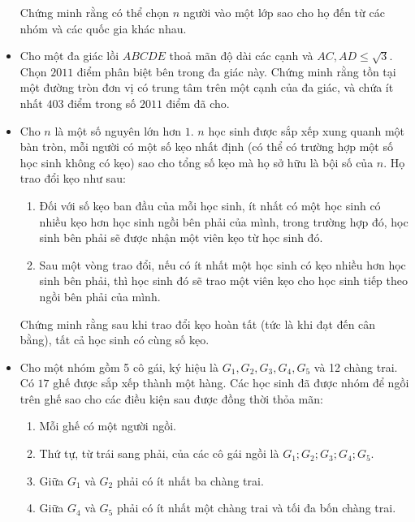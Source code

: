 \documentclass[11pt]{scrartcl}
\begin{document}
\begin{itemize}[label=, leftmargin=0em, itemsep=0.5em]
\begin{btvn}
        Chứng minh rằng có thể chọn $n$ người vào một lớp sao cho họ đến từ các nhóm và các quốc gia khác nhau.
    \end{btvn}

    \item \begin{btvn}
        Cho một đa giác lồi $ABCDE$ thoả mãn độ dài các cạnh và $AC, AD \leq \sqrt{3}.$ Chọn $2011$ điểm phân biệt bên trong đa giác này. Chứng minh rằng tồn tại một đường tròn đơn vị có trung tâm trên một cạnh của đa giác, và chứa ít nhất $403$ điểm trong số $2011$ điểm đã cho.

    \end{btvn}

    \item \begin{btvn}
        Cho $n$ là một số nguyên lớn hơn $1.$ $n$ học sinh được sắp xếp xung quanh một bàn tròn, mỗi người có một số kẹo nhất định (có thể có trường hợp một số học sinh không có kẹo) sao cho tổng số kẹo mà họ sở hữu là bội số của $n.$ Họ trao đổi kẹo như sau: 
        
        \begin{enumerate}
            \item Đối với số kẹo ban đầu của mỗi học sinh, ít nhất có một học sinh có nhiều kẹo hơn học sinh ngồi bên phải của mình, trong trường hợp đó, học sinh bên phải sẽ được nhận một viên kẹo từ học sinh đó.
            \item Sau một vòng trao đổi, nếu có ít nhất một học sinh có kẹo nhiều hơn học sinh bên phải, thì học sinh đó sẽ trao một viên kẹo cho học sinh tiếp theo ngồi bên phải của mình.
        \end{enumerate}  
        Chứng minh rằng sau khi trao đổi kẹo hoàn tất (tức là khi đạt đến cân bằng), tất cả học sinh có cùng số kẹo.
    \end{btvn}

    \item \begin{btvn}
        Cho một nhóm gồm 5 cô gái, ký hiệu là $G_1,G_2,G_3,G_4,G_5$ và 12 chàng trai. Có $17$ ghế được sắp xếp thành một hàng. Các học sinh đã được nhóm để ngồi trên ghế sao cho các điều kiện sau được đồng thời thỏa mãn:
        \begin{enumerate}[label=(\alph*)]
            \item Mỗi ghế có một người ngồi.
            \item Thứ tự, từ trái sang phải, của các cô gái ngồi là $G_1; G_2; G_3; G_4; G_5.$
            \item Giữa $G_1$ và $G_2$ phải có ít nhất ba chàng trai.
            \item Giữa $G_4$ và $G_5$ phải có ít nhất một chàng trai và tối đa bốn chàng trai.
            

\end{enumerate}
\end{btvn}
\end{itemize}
\end{document}
